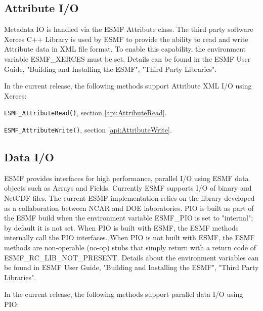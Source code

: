 \subsection{Attribute I/O}
\label{io:attributeio}

Metadata IO is handled via the ESMF Attribute class. The third
party software Xerces C++ Library is used by ESMF to provide
the ability to read and write Attribute data in XML file format.
To enable this capability, the environment variable ESMF\_XERCES must be
set. Details can be found in the ESMF User Guide, "Building and Installing the ESMF", "Third Party Libraries".

In the current release, the following methods support Attribute XML I/O using Xerces:

\begin{description}
\item {\tt ESMF\_AttributeRead()}, section \ref{api:AttributeRead}.
\item {\tt ESMF\_AttributeWrite()}, section \ref{api:AttributeWrite}.
\end{description}


\subsection{Data I/O}
\label{io:dataio}

\begin{sloppypar}
ESMF provides interfaces for high performance, parallel I/O using ESMF data
objects such as Arrays and Fields.  Currently ESMF supports I/O of binary and
NetCDF files.  The current ESMF implementation relies on the 
 library developed as a collaboration between NCAR and DOE 
laboratories.  PIO is built as part of the ESMF build when the environment 
variable ESMF\_PIO is set to "internal"; by default it is not set.
When PIO is built with ESMF, the ESMF methods internally call the PIO 
interfaces.  When PIO is not built with ESMF, the ESMF methods are 
non-operable (no-op) stubs that simply return with a return code of
ESMF\_RC\_LIB\_NOT\_PRESENT.  Details about the environment variables can be 
found in ESMF User Guide, "Building and Installing the ESMF", 
"Third Party Libraries".
\end{sloppypar}

In the current release, the following methods support parallel data I/O using PIO:


